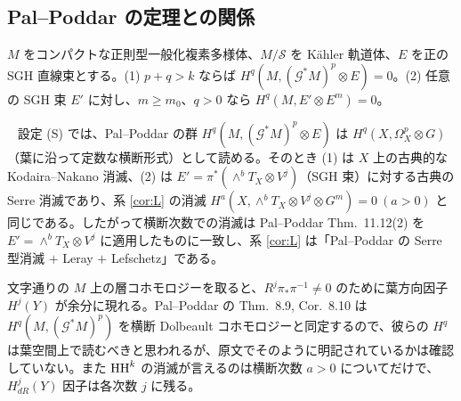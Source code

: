 \subsection{Pal--Poddar の定理との関係}\label{subsec:PPcompare}
\begin{thm}\tC
$M$ をコンパクトな正則型一般化複素多様体、$M/\mathcal S$ を Kähler 軌道体、$E$ を正の SGH 直線束とする。(1) $p+q>k$ ならば $H^q(M,(\mathcal G^*M)^p\otimes E)=0$。(2) 任意の SGH 束 $E'$ に対し、$m\ge m_0$、$q>0$ なら $H^q(M,E'\otimes E^m)=0$。
\end{thm}
\begin{prop}\tP\ \tQ\label{prop:PPcompare}
設定 (S) では、Pal--Poddar の群 $H^q(M,(\mathcal G^*M)^p\otimes E)$ は $H^q(X,\Omega^p_X\otimes G)$（葉に沿って定数な横断形式）として読める。そのとき (1) は $X$ 上の古典的な Kodaira--Nakano 消滅、(2) は $E'=\pi^*(\wedge^bT_X\otimes V^j)$（SGH 束）に対する古典の Serre 消滅であり、系 \ref{cor:L} の消滅 $H^a(X,\wedge^bT_X\otimes V^j\otimes G^m)=0\ (a>0)$ と同じである。したがって横断次数での消滅は Pal--Poddar Thm.\ 11.12(2) を $E'=\wedge^bT_X\otimes V^j$ に適用したものに一致し、系 \ref{cor:L} は「Pal--Poddar の Serre 型消滅 $+$ Leray $+$ Lefschetz」である。
\end{prop}
\begin{rem}[\tQ]
文字通りの $M$ 上の層コホモロジーを取ると、$R^j\pi_*\pi^{-1}\ne0$ のために葉方向因子 $H^j(Y)$ が余分に現れる。Pal--Poddar の Thm.\ 8.9, Cor.\ 8.10 は $H^q(M,(\mathcal G^*M)^p)$ を横断 Dolbeault コホモロジーと同定するので、彼らの $H^q$ は葉空間上で読むべきと思われるが、原文でそのように明記されているかは確認していない。また $\mathrm{HH}^k$ の消滅が言えるのは横断次数 $a>0$ についてだけで、$H^j_{dR}(Y)$ 因子は各次数 $j$ に残る。
\end{rem}

